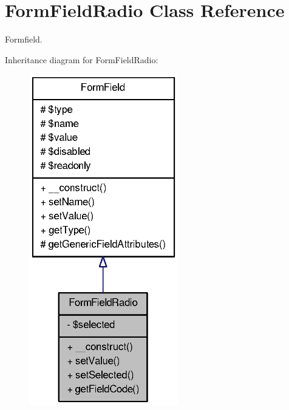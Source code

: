 \section{FormFieldRadio Class Reference}
\label{classFormFieldRadio}


Formfield.  




Inheritance diagram for FormFieldRadio:\nopagebreak
\begin{figure}[H]
\begin{center}
\leavevmode
\includegraphics[width=184pt]{classFormFieldRadio__inherit__graph}
\end{center}
\end{figure}


